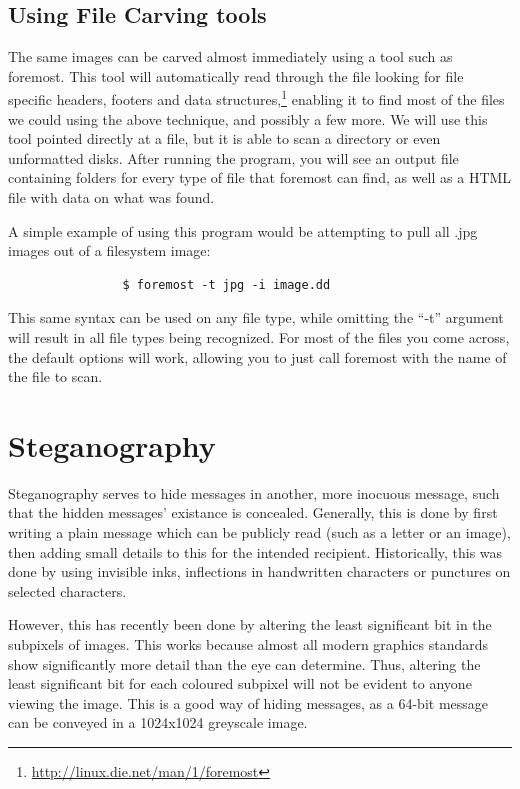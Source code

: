 		\subsection{Using File Carving tools}
			The same images can be carved almost immediately using a tool such as foremost.
			This tool will automatically read through the file looking for file specific headers, footers and data structures,\footnote{\url{http://linux.die.net/man/1/foremost}}
			enabling it to find most of the files we could using the above technique, and possibly a few more.
			We will use this tool pointed directly at a file, but it is able to scan a directory or even unformatted disks.
			After running the program, you will see an output file containing folders for every type of file that foremost can find, as well as a HTML file with data on what was found.

			A simple example of using this program would be attempting to pull all .jpg images out of a filesystem image:
			\begin{verbatim}
				$ foremost -t jpg -i image.dd
			\end{verbatim}
			This same syntax can be used on any file type, while omitting the ``-t'' argument will result in all file types being recognized.
			For most of the files you come across, the default options will work, allowing you to just call foremost with the name of the file to scan.


	\section{Steganography}
		Steganography serves to hide messages in another, more inocuous message, such that the hidden messages' existance is concealed.
		Generally, this is done by first writing a plain message which can be publicly read (such as a letter or an image),
		then adding small details to this for the intended recipient.
		Historically, this was done by using invisible inks, inflections in handwritten characters or punctures on selected characters.

		However, this has recently been done by altering the least significant bit in the subpixels of images.
		This works because almost all modern graphics standards show significantly more detail than the eye can determine.
		Thus, altering the least significant bit for each coloured subpixel will not be evident to anyone viewing the image.
		This is a good way of hiding messages, as a 64-bit message can be conveyed in a 1024x1024 greyscale image.

